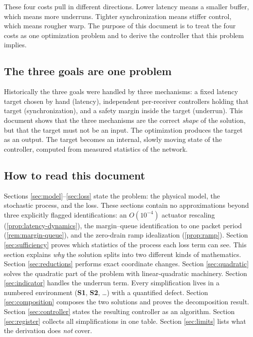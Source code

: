 \documentclass[11pt, a4paper]{article}
\theoremstyle{definition}
\theoremstyle{plain}
\theoremstyle{remark}
\begin{document}
These four costs pull in different directions.  Lower latency means a
smaller buffer, which means more underruns.  Tighter synchronization means
stiffer control, which means rougher warp.  The purpose of this document is
to treat the four costs as one optimization problem and to derive the
controller that this problem implies.

\subsection{The three goals are one problem}\label{sec:one-problem}

Historically the three goals were handled by three mechanisms: a fixed
latency target chosen by hand (latency), independent per-receiver
controllers holding that target (synchronization), and a safety margin
inside the target (underrun).  This document shows that the three
mechanisms are the correct \emph{shape} of the solution, but that the
target must not be an input.  The optimization produces the target as an
output.  The target becomes an internal, slowly moving state of the
controller, computed from measured statistics of the network.

\subsection{How to read this document}\label{sec:how-to-read}

Sections \ref{sec:model}--\ref{sec:loss} state the problem: the physical
model, the stochastic process, and the loss.  These sections contain no
approximations beyond three explicitly flagged identifications: an
$O(10^{-4})$ actuator rescaling (\cref{prop:latency-dynamics}), the
margin--queue identification to one packet period
(\cref{rem:margin-queue}), and the zero-drain ramp idealization
(\cref{prop:ramp}).  Section \ref{sec:sufficiency} proves which statistics
of the process each loss term can see.  This section explains \emph{why}
the solution splits into two different kinds of mathematics.
Section \ref{sec:reductions} performs exact coordinate changes.
Section \ref{sec:quadratic} solves the quadratic part of the problem with
linear-quadratic machinery.  Section \ref{sec:indicator} handles the
underrun term.  Every simplification lives in a numbered environment
(\textbf{S1}, \textbf{S2}, \dots) with a quantified defect.
Section \ref{sec:composition} composes the two solutions and proves the
decomposition result.  Section \ref{sec:controller} states the resulting
controller as an algorithm.  Section \ref{sec:register} collects all
simplifications in one table.  Section \ref{sec:limits} lists what the
derivation does \emph{not} cover.
\end{document}
